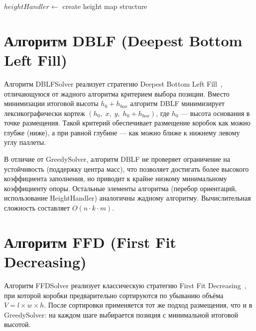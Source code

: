\begin{algorithm}[H]
\caption{Жадный алгоритм укладки (GreedySolver)}
\label{alg:evyukh_greedy}
$heightHandler \leftarrow$ create height map structure\;
\end{algorithm}

\section{Алгоритм DBLF (Deepest Bottom Left Fill)}

Алгоритм DBLFSolver реализует стратегию Deepest Bottom Left Fill~\cite{karabulut}, отличающуюся от жадного алгоритма критерием выбора позиции. Вместо минимизации итоговой высоты $h_0 + h_{box}$ алгоритм DBLF минимизирует лексикографически кортеж $(h_0,\; x,\; y,\; h_0 + h_{box})$, где $h_0$ --- высота основания в точке размещения. Такой критерий обеспечивает размещение коробок как можно глубже (ниже), а при равной глубине --- как можно ближе к нижнему левому углу паллеты.

В отличие от GreedySolver, алгоритм DBLF не проверяет ограничение на устойчивость (поддержку центра масс), что позволяет достигать более высокого коэффициента заполнения, но приводит к крайне низкому минимальному коэффициенту опоры. Остальные элементы алгоритма (перебор ориентаций, использование HeightHandler) аналогичны жадному алгоритму. Вычислительная сложность составляет $O(n \cdot k \cdot m)$.

\section{Алгоритм FFD (First Fit Decreasing)}

Алгоритм FFDSolver реализует классическую стратегию First Fit Decreasing~\cite{CoffmanFFD1996}, при которой коробки предварительно сортируются по убыванию объёма $V = l \times w \times h$. После сортировки применяется тот же подход размещения, что и в GreedySolver: на каждом шаге выбирается позиция с минимальной итоговой высотой.

